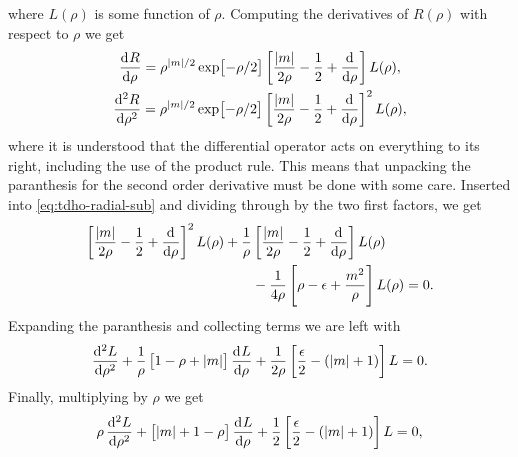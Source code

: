         where $L(\rho)$ is some function of $\rho$.
        Computing the derivatives of $R(\rho)$ with respect to $\rho$ we get
        \begin{gather}
            \dod{R}{\rho}
            = \rho^{\abs{m}/2} \exp[-\rho/2]\brak{
                \frac{\abs{m}}{2\rho}
                - \half
                + \dod{}{\rho}
            }L(\rho),
            \\
            \dod[2]{R}{\rho}
            = \rho^{\abs{m}/2} \exp[-\rho/2]\brak{
                \frac{\abs{m}}{2\rho}
                - \half
                + \dod{}{\rho}
            }^2 L(\rho),
        \end{gather}
        where it is understood that the differential operator acts on everything
        to its right, including the use of the product rule.
        This means that unpacking the paranthesis for the second order
        derivative must be done with some care.
        Inserted into \autoref{eq:tdho-radial-sub} and dividing through by the
        two first factors, we get
        \begin{align}
            \brak{
                \frac{\abs{m}}{2\rho}
                - \half
                + \dod{}{\rho}
            }^2
            L(\rho)
            &+ \frac{1}{\rho}
            \brak{
                \frac{\abs{m}}{2\rho}
                - \half
                + \dod{}{\rho}
            }
            L(\rho)
            \nonumber \\
            &\qquad
            - \frac{1}{4\rho}\brak{
                \rho
                - \epsilon
                + \frac{m^2}{\rho}
            }
            L(\rho)
            = 0.
        \end{align}
        Expanding the paranthesis and collecting terms we are left with
        \begin{align}
            \dod[2]{L}{\rho}
            + \frac{1}{\rho}\brak{
                1 - \rho + \abs{m}
            }\dod{L}{\rho}
            + \frac{1}{2\rho}\brak{
                \frac{\epsilon}{2}
                - (\abs{m} + 1)
            }L
            = 0.
        \end{align}
        Finally, multiplying by $\rho$ we get
        \begin{align}
            \rho\dod[2]{L}{\rho}
            + \brak{
                \abs{m}+ 1 - \rho
            }\dod{L}{\rho}
            + \frac{1}{2}\brak{
                \frac{\epsilon}{2}
                - (\abs{m} + 1)
            }L
            = 0,
        \end{align}
